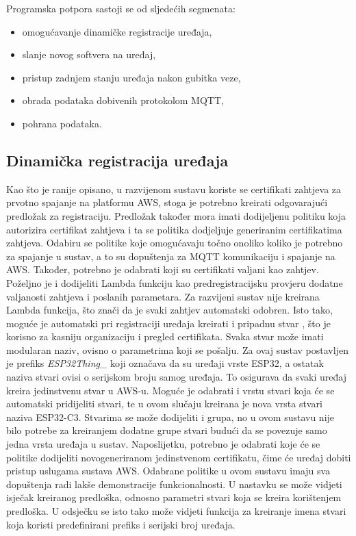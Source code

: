 Programska potpora sastoji se od sljedećih segmenata:
\begin{itemize}
	\item omogućavanje dinamičke registracije uređaja,
	\item slanje novog softvera na uređaj,
	\item pristup zadnjem stanju uređaja nakon gubitka veze,
	\item obrada podataka dobivenih protokolom MQTT,
	\item pohrana podataka.
\end{itemize}

\subsection{Dinamička registracija uređaja}

Kao što je ranije opisano, u razvijenom sustavu koriste se certifikati zahtjeva za prvotno spajanje na platformu AWS, stoga je potrebno kreirati odgovarajući predložak za registraciju. Predložak također mora imati dodijeljenu politiku koja autorizira certifikat zahtjeva i ta se politika dodjeljuje generiranim certifikatima zahtjeva. Odabiru se politike koje omogućavaju točno onoliko koliko je potrebno za spajanje u sustav, a to su dopuštenja za MQTT komunikaciju i spajanje na AWS. Također, potrebno je odabrati koji su certifikati valjani kao zahtjev. Poželjno je i dodijeliti Lambda funkciju kao predregistracijsku provjeru dodatne valjanosti zahtjeva i poslanih parametara. Za razvijeni sustav nije kreirana Lambda funkcija, što znači da je svaki zahtjev automatski odobren. Isto tako, moguće je automatski pri registraciji uređaja kreirati i pripadnu stvar , što je korisno za kasniju organizaciju i pregled certifikata. Svaka stvar može imati modularan naziv, ovisno o parametrima koji se pošalju. Za ovaj sustav postavljen je prefiks \textit{ESP32Thing\_} koji označava da su uređaji vrste ESP32, a ostatak naziva stvari ovisi o serijskom broju samog uređaja. To osigurava da svaki uređaj kreira jedinstvenu stvar u AWS-u. Moguće je odabrati i vrstu stvari  koja će se automatski pridijeliti stvari, te u ovom slučaju kreirana je nova vrsta stvari naziva ESP32-C3. Stvarima se može dodijeliti i grupa, no u ovom sustavu nije bilo potrebe za kreiranjem dodatne grupe stvari budući da se povezuje samo jedna vrsta uređaja u sustav. Naposlijetku, potrebno je odabrati koje će se politike dodijeliti novogeneriranom jedinstvenom certifikatu, čime će uređaj dobiti pristup uslugama sustava AWS. Odabrane politike u ovom sustavu imaju sva dopuštenja radi lakše demonstracije funkcionalnosti. U nastavku se može vidjeti isječak kreiranog predloška, odnosno parametri stvari koja se kreira korištenjem predloška. U odsječku se isto tako može vidjeti funkcija za kreiranje imena stvari koja koristi predefinirani prefiks i serijski broj uređaja. 

